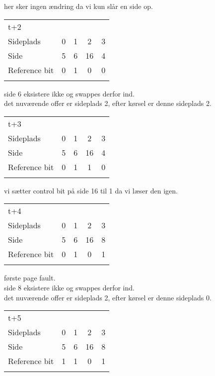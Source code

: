 \documentclass[titlepage]{article}
\begin{document}
her sker ingen ændring da vi kun slår en side op.\\

\begin{tabular}{l | c | c | c | c}
t+2\\
Sideplads    & 0 & 1 & 2 & 3\\
Side         & 5 & 6 & 16 & 4\\
Reference bit & 0 & 1 & 0 & 0\\\\
\end{tabular}

side 6 eksistere ikke og swappes derfor ind.\\
det nuværende offer er sideplads 2, efter kørsel er denne sideplads 2.\\

\begin{tabular}{l | c | c | c | c}
t+3\\
Sideplads    & 0 & 1 & 2 & 3\\
Side         & 5 & 6 & 16 & 4\\
Reference bit & 0 & 1 & 1 & 0\\\\
\end{tabular}

vi sætter control bit på side 16 til 1 da vi læser den igen.\\


\begin{tabular}{l | c | c | c | c}
t+4\\
Sideplads    & 0 & 1 & 2 & 3\\
Side         & 5 & 6 & 16 & 8\\
Reference bit & 0 & 1 & 0 & 1\\\\
\end{tabular}

første page fault.\\
side 8 eksistere ikke og swappes derfor ind.\\
det nuværende offer er sideplads 2, efter kørsel er denne sideplads 0.\\

\begin{tabular}{l | c | c | c | c}
t+5\\
Sideplads    & 0 & 1 & 2 & 3\\
Side         & 5 & 6 & 16 & 8\\
Reference bit & 1 & 1 & 0 & 1\\\\
\end{tabular}
\end{document}
